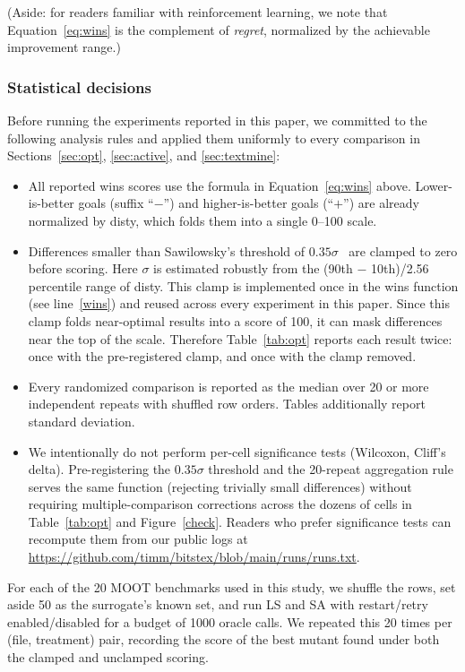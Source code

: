 \documentclass[AMA,STIX2COL]{WileyNJDv5}
\begin{document}
(Aside: for readers familiar with reinforcement learning,
we note that Equation~\ref{eq:wins} is the
complement of {\em regret}, normalized by the achievable
improvement range.)

\subsubsection{Statistical decisions}
Before running the experiments reported in this paper, we
committed to the following analysis rules and applied them
uniformly to every comparison in Sections~\ref{sec:opt},
\ref{sec:active}, and \ref{sec:textmine}:
\begin{itemize}
\item All reported \textsf{wins} scores use the formula in
Equation~\ref{eq:wins} above. Lower-is-better goals
(suffix ``$-$'') and higher-is-better goals (``$+$'') are
already normalized by \textsf{disty}, which folds them into
a single 0--100 scale.
\item Differences smaller than Sawilowsky's threshold of
$0.35\sigma$~\cite{sawilowsky2009new} are clamped to zero
before scoring. Here $\sigma$ is estimated robustly from the
(90th $-$ 10th)/2.56 percentile range of \textsf{disty}.
This clamp is implemented once in the \textsf{wins}
function (see line~\ref{wins}) and reused across every
experiment in this paper. Since this clamp folds
near-optimal results into a score of 100, it can mask
differences near the top of the scale. Therefore
Table~\ref{tab:opt} reports each result twice: once with the
pre-registered clamp, and once with the clamp removed.
\item Every randomized comparison is reported as the median
over 20 or more independent repeats with shuffled row
orders. Tables additionally report standard deviation.
\item We intentionally do not perform per-cell significance
tests (Wilcoxon, Cliff's delta). Pre-registering the
$0.35\sigma$ threshold and the 20-repeat aggregation rule
serves the same function (rejecting trivially small
differences) without requiring multiple-comparison
corrections across the dozens of cells in
Table~\ref{tab:opt} and Figure~\ref{check}. Readers who
prefer significance tests can recompute them from our
public logs at
\url{https://github.com/timm/bitstex/blob/main/runs/runs.txt}.
\end{itemize}

For each of the 20 MOOT benchmarks used in this study, we shuffle the
rows, set aside 50 as the surrogate's known set, and run
LS and SA with restart/retry enabled/disabled
for a budget of 1000 oracle calls. We repeated
this 20 times per (file, treatment) pair, recording the score of
the best mutant found under both the clamped and
unclamped scoring.
\end{document}
